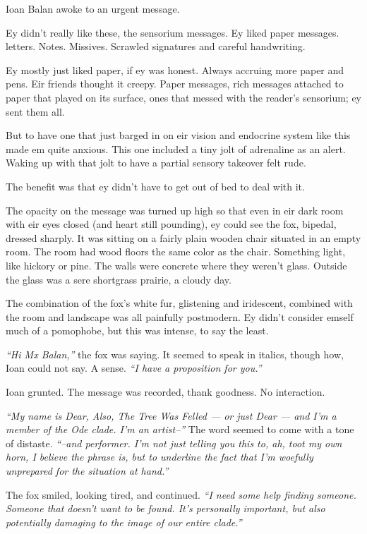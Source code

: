 Ioan Balan awoke to an urgent message.

Ey didn't really like these, the sensorium messages. Ey liked paper messages. letters. Notes. Missives. Scrawled signatures and careful handwriting.

Ey mostly just liked paper, if ey was honest. Always accruing more paper and pens. Eir friends thought it creepy. Paper messages, rich messages attached to paper that played on its surface, ones that messed with the reader's sensorium; ey sent them all.

But to have one that just barged in on eir vision and endocrine system like this made em quite anxious. This one included a tiny jolt of adrenaline as an alert. Waking up with that jolt to have a partial sensory takeover felt rude.

The benefit was that ey didn't have to get out of bed to deal with it.

The opacity on the message was turned up high so that even in eir dark room with eir eyes closed (and heart still pounding), ey could see the fox, bipedal, dressed sharply. It was sitting on a fairly plain wooden chair situated in an empty room. The room had wood floors the same color as the chair. Something light, like hickory or pine. The walls were concrete where they weren't glass. Outside the glass was a sere shortgrass prairie, a cloudy day.

The combination of the fox's white fur, glistening and iridescent, combined with the room and landscape was all painfully postmodern. Ey didn't consider emself much of a pomophobe, but this was intense, to say the least.

\emph{``Hi Mx Balan,''} the fox was saying. It seemed to speak in italics, though how, Ioan could not say. A sense. \emph{``I have a proposition for you.''}

Ioan grunted. The message was recorded, thank goodness. No interaction.

\emph{``My name is Dear, Also, The Tree Was Felled --- or just Dear --- and I'm a member of the Ode clade. I'm an artist--''} The word seemed to come with a tone of distaste. \emph{``--and performer. I'm not just telling you this to, ah, toot my own horn, I believe the phrase is, but to underline the fact that I'm woefully unprepared for the situation at hand.''}

The fox smiled, looking tired, and continued. \emph{``I need some help finding someone. Someone that doesn't want to be found. It's personally important, but also potentially damaging to the image of our entire clade.''}


